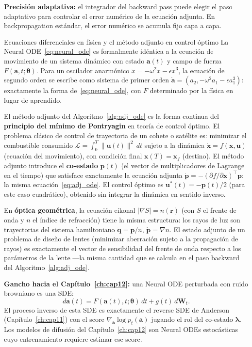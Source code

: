 \medskip
\noindent\textbf{Precisión adaptativa:} el integrador del backward pass puede
elegir el paso adaptativo para controlar el error numérico de la ecuación
adjunta. En backpropagation estándar, el error numérico se acumula fijo capa
a capa.

\begin{fisicaconexion}{Ecuaciones diferenciales en física y el método adjunto en control óptimo}
La Neural ODE~\eqref{eq:neural_ode} es formalmente idéntica a la ecuación de
movimiento de un sistema dinámico con estado $\bm{a}(t)$ y campo de fuerza
$F(\bm{a},t;\bm{\theta})$. Para un oscilador anarmónico $\ddot{x} = -\omega^2 x -
\epsilon x^3$, la ecuación de segundo orden se escribe como sistema de primer
orden $\dot{\bm{a}} = (a_2, -\omega^2 a_1 - \epsilon a_1^3)$: exactamente la
forma de~\eqref{eq:neural_ode}, con $F$ determinado por la física en lugar de
aprendido.

El método adjunto del Algoritmo~\ref{alg:adj_ode} es la forma continua del
\textbf{principio del mínimo de Pontryagin} en teoría de control óptimo. El
problema clásico de control de trayectoria de un cohete o satélite es:
minimizar el combustible consumido $\mathcal{L} = \int_0^T \|\bm{u}(t)\|^2\,dt$
sujeto a la dinámica $\dot{\bm{x}} = f(\bm{x},\bm{u})$ (ecuación del
movimiento), con condición final $\bm{x}(T) = \bm{x}_f$ (destino). El método
adjunto introduce el \textbf{co-estado} $\bm{p}(t)$ (el vector de multiplicadores
de Lagrange en el tiempo) que satisface exactamente la ecuación adjunta
$\dot{\bm{p}} = -(\partial f/\partial \bm{x})^\top\bm{p}$: la misma
ecuación~\eqref{eq:adj_ode}. El control óptimo es $\bm{u}^*(t) = -\bm{p}(t)/2$
(para este caso cuadrático), obtenido sin integrar la dinámica en sentido
inverso.

En \textbf{óptica geométrica}, la ecuación eikonal $|\nabla S| = n(\bm{r})$
(con $S$ el frente de onda y $n$ el índice de refracción) tiene la misma
estructura: los rayos de luz son trayectorias del sistema hamiltoniano
$\dot{\bm{q}} = \bm{p}/n$, $\dot{\bm{p}} = \nabla n$. El estado adjunto de un
problema de diseño de lentes (minimizar aberración sujeto a la propagación de
rayos) es exactamente el vector de sensibilidad del frente de onda respecto a
los parámetros de la lente —la misma cantidad que se calcula en el paso
backward del Algoritmo~\ref{alg:adj_ode}.
\end{fisicaconexion}

\medskip
\noindent\textbf{Gancho hacia el Capítulo~\ref{ch:cap12}:} una Neural ODE perturbada con
ruido browniano es una SDE:
\[
  d\bm{a}(t) = F(\bm{a}(t),t;\bm{\theta})\,dt + g(t)\,d\bm{W}_t.
\]
El proceso inverso de esta SDE es exactamente el reverse SDE de Anderson
(Capítulo~\ref{ch:cap11}) con el score $\nabla_{\bm{a}}\log p_t(\bm{a})$ jugando el rol
del co-estado $\bm{\lambda}$. Los modelos de difusión del Capítulo~\ref{ch:cap12} son
Neural ODEs estocásticas cuyo entrenamiento requiere estimar ese score.

